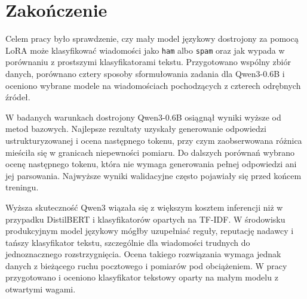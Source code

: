 \chapter{Zakończenie}

Celem pracy było sprawdzenie, czy mały model językowy dostrojony za pomocą LoRA
może klasyfikować wiadomości jako \texttt{ham} albo \texttt{spam} oraz jak
wypada w porównaniu z prostszymi klasyfikatorami tekstu. Przygotowano wspólny
zbiór danych, porównano cztery sposoby sformułowania zadania dla Qwen3-0.6B i
oceniono wybrane modele na wiadomościach pochodzących z czterech odrębnych
źródeł.

W badanych warunkach dostrojony Qwen3-0.6B osiągnął wyniki wyższe od metod
bazowych. Najlepsze rezultaty uzyskały generowanie odpowiedzi
ustrukturyzowanej i ocena następnego tokenu, przy czym zaobserwowana różnica
mieściła się w granicach niepewności pomiaru. Do dalszych porównań wybrano
ocenę następnego tokenu, która nie wymaga generowania pełnej odpowiedzi ani jej
parsowania. Najwyższe wyniki walidacyjne często pojawiały się przed końcem
treningu.

Wyższa skuteczność Qwen3 wiązała się z większym kosztem inferencji niż w
przypadku DistilBERT i klasyfikatorów opartych na TF-IDF. W środowisku
produkcyjnym model językowy mógłby uzupełniać reguły, reputację nadawcy i
tańszy klasyfikator tekstu, szczególnie dla wiadomości trudnych do
jednoznacznego rozstrzygnięcia. Ocena takiego rozwiązania wymaga jednak danych
z bieżącego ruchu pocztowego i pomiarów pod obciążeniem. W pracy przygotowano i
oceniono klasyfikator tekstowy oparty na małym modelu z otwartymi wagami.
